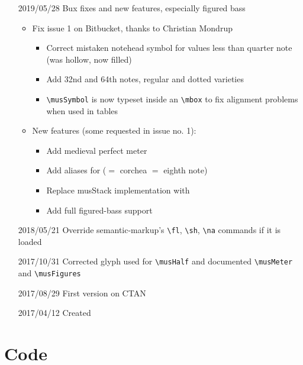\documentclass{article}
\begin{document}
\begin{itemize}
    \item[2019/05/28] Bux fixes and new features, especially figured bass
        \begin{itemize}
            \item Fix issue 1 on Bitbucket, thanks to Christian Mondrup
                \begin{itemize}
                    \item Correct mistaken notehead symbol for values less than
                        quarter note (was hollow, now filled)
                    \item Add 32nd and 64th notes, regular and dotted varieties
                    \item \verb|\musSymbol| is now typeset inside an
                        \verb|\mbox| to fix alignment problems when used in
                        tables
                \end{itemize}
            \item New features (some requested in issue no. 1):
                \begin{itemize}
                    \item Add medieval perfect meter
                    \item Add aliases for  ($=$ corchea $=$ eighth note)
                    \item Replace musStack implementation with 
                    \item Add full figured-bass support
                \end{itemize}
        \end{itemize}
    \item[2018/05/21] Override semantic-markup's \verb|\fl|, \verb|\sh|,
        \verb|\na| commands if it is loaded
    \item[2017/10/31] Corrected glyph used for \verb|\musHalf| and documented
        \verb|\musMeter| and \verb|\musFigures|
    \item[2017/08/29] First version on CTAN
    \item[2017/04/12] Created
\end{itemize}

\section{Code}

\end{document}
